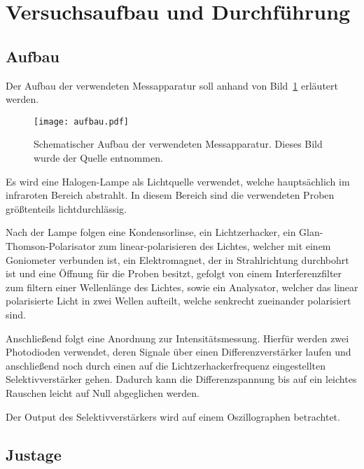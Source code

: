 
\section{Versuchsaufbau und Durchführung}
\subsection{Aufbau}
%

Der Aufbau der verwendeten Messapparatur soll anhand von 
Bild~\ref{fig:aufbau} erläutert werden.

\begin{figure}
\centering
\texttt{[image: aufbau.pdf]}
\caption{Schematischer Aufbau der verwendeten Messapparatur. 
Dieses Bild wurde der Quelle \cite{v046} entnommen.}
\label{fig:aufbau}
\end{figure}

Es wird eine Halogen-Lampe als Lichtquelle verwendet, welche 
hauptsächlich im infraroten Bereich abstrahlt. In diesem Bereich 
sind die verwendeten Proben größtenteils lichtdurchlässig.

Nach der Lampe folgen eine Kondensorlinse, ein Lichtzerhacker, 
ein Glan-Thomson-Polarisator zum linear-polarisieren des Lichtes, 
welcher mit einem Goniometer verbunden ist, ein Elektromagnet, 
der in Strahlrichtung durchbohrt ist und eine Öffnung für die Proben 
besitzt, gefolgt von einem Interferenzfilter zum filtern einer 
Wellenlänge des Lichtes, sowie ein Analysator, welcher das 
linear polarisierte Licht in zwei Wellen aufteilt, welche 
senkrecht zueinander polarisiert sind.

Anschließend folgt eine Anordnung zur Intensitätsmessung. 
Hierfür werden zwei Photodioden verwendet, deren Signale 
über einen Differenzverstärker laufen und anschließend 
noch durch einen auf die Lichtzerhackerfrequenz eingestellten 
Selektivverstärker gehen. Dadurch kann die Differenzspannung 
bis auf ein leichtes Rauschen leicht auf Null abgeglichen werden.

Der Output des Selektivverstärkers wird auf einem Oszillographen betrachtet.

%
\subsection{Justage}
%

